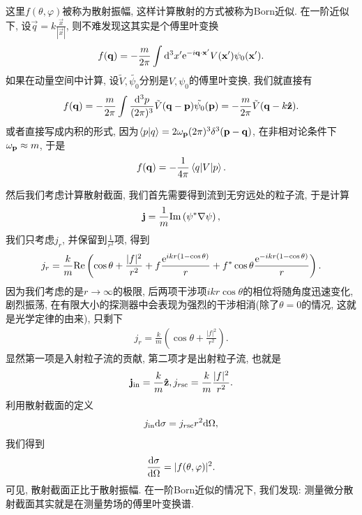 这里$f(\theta, \varphi)$被称为散射振幅, 这样计算散射的方式被称为Born近似. 在一阶近似下, 设$\vec q=k\frac{\vec x}{|\vec x|}$, 则不难发现这其实是个傅里叶变换
\begin{align}
    f(\vec q)=-\frac{m}{2\pi}\int\d^3x'\exp{-i\vec q\cdot\vec x'}V(\vec x')\psi_0(\vec x').
\end{align}
如果在动量空间中计算, 设$\tilde V, \tilde{\psi_0}$分别是$V, \psi_0$的傅里叶变换, 我们就直接有
\begin{align}
    f(\vec q)=-\frac{m}{2\pi}\int\ddd p\tilde{V}(\vec q-\vec p)\tilde{\psi_0}(\vec p)=-\frac{m}{2\pi}\tilde{V}(\vec q-k\uvec z).
\end{align}
或者直接写成内积的形式, 因为$\braket{p|q}=2\om p\dpi3\delta^3(\vec p-\vec q)$, 在非相对论条件下$\om p\approx m$, 于是
\begin{align}
    f(\vec q)=-\frac1{4\pi}\braket{q|V|p}\label{born-amplitude-V}.
\end{align}

然后我们考虑计算散射截面, 我们首先需要得到流到无穷远处的粒子流, 于是计算
\begin{align}
    \vec j=\frac1m\rm{Im}\left(\psi^*\nabla\psi\right), 
\end{align}
我们只考虑$j_r$, 并保留到$\frac 1{r^2}$项, 得到
\begin{align}
    j_r=\frac km\rm{Re}\left(\cos\theta+\frac{|f|^2}{r^2}+f\frac{\exp{ikr(1-\cos\theta)}}{r}+f^*\cos\theta\frac{\exp{-ikr(1-\cos\theta)}}{r}\right).
\end{align}
因为我们考虑的是$r\to\infty$的极限, 后两项干涉项$ikr\cos\theta$的相位将随角度迅速变化, 剧烈振荡, 在有限大小的探测器中会表现为强烈的干涉相消(除了$\theta=0$的情况, 这就是光学定律的由来), 只剩下
\begin{align}
    j_r=\frac km\left(\cos\theta+\frac{|f|^2}{r^2}\right).
\end{align}
显然第一项是入射粒子流的贡献, 第二项才是出射粒子流, 也就是
\begin{align}
    \vec j_{\rm{in}}=\frac km\uvec z, j_{r\rm{sc}}=\frac km\frac{|f|^2}{r^2}.
\end{align}
利用散射截面的定义
\begin{align}
    j_{\rm{in}}\d\sigma=j_{r\rm{sc}} r^2\d\Omega,
\end{align}
我们得到
\begin{align}
    \frac{\d\sigma}{\d\Omega}=|f(\theta, \varphi)|^2.
\end{align}
可见, 散射截面正比于散射振幅. 在一阶Born近似的情况下, 我们发现: 测量微分散射截面其实就是在测量势场的傅里叶变换谱.

